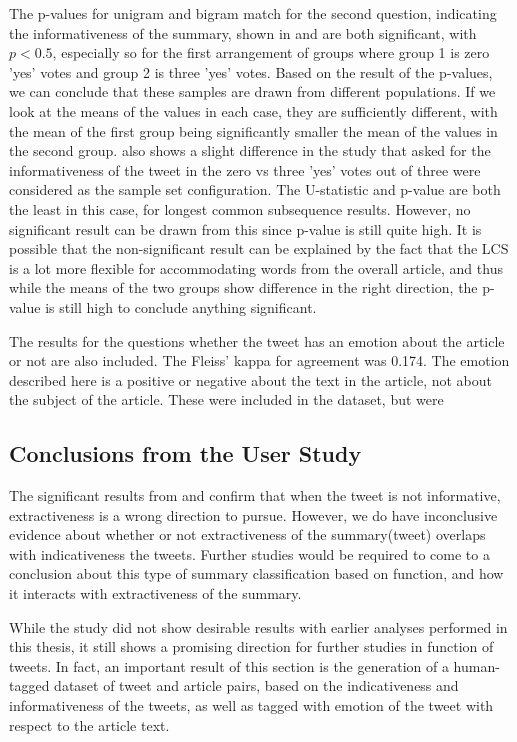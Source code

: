 The p-values for unigram and bigram match for the second question, indicating the informativeness of the summary, shown in  and  are both significant, with $p<0.5$, especially so for the first arrangement of groups where group 1 is zero 'yes' votes and group 2 is three 'yes' votes. Based on the result of the p-values, we can conclude that these samples are drawn from different populations. If we look at the means of the values in each case, they are sufficiently different, with the mean of the first group being significantly smaller the mean of the values in the second group.  also shows a slight difference in the study that asked for the informativeness of the tweet in the zero vs three 'yes' votes out of three were considered as the sample set configuration. The U-statistic and p-value are both the least in this case, for longest common subsequence results. However, no significant result can be drawn from this since p-value is still quite high. It is possible that the non-significant result can be explained by the fact that the LCS is a lot more flexible for accommodating words from the overall article, and thus while the means of the two groups show difference in the right direction, the p-value is still high to conclude anything significant. 


The results for the questions whether the tweet has an emotion about the article or not are also included. The Fleiss' kappa for agreement was 0.174. The emotion described here is a positive or negative about the text in the article, not about the subject of the article. These were included in the dataset, but were 
 

\subsection{Conclusions from the User Study}

The significant results from  and  confirm that when the tweet is not informative, extractiveness is a wrong direction to pursue. However, we do have inconclusive evidence about whether or not extractiveness of the summary(tweet) overlaps with indicativeness the tweets. Further studies would be required to come to a conclusion about this type of summary classification based on function, and how it interacts with extractiveness of the summary. 

While the study did not show desirable results with earlier analyses performed in this thesis, it still shows a promising direction for further studies in function of tweets. In fact, an important result of this section is the generation of a human-tagged dataset of tweet and article pairs, based on the indicativeness and informativeness of the tweets, as well as tagged with emotion of the tweet with respect to the article text. 

